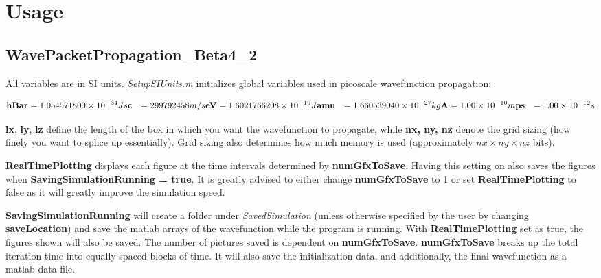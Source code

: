 \documentclass[11pt,letterpaper]{article}
\renewcommand{\\}{\bigskip}
\begin{document}
\section{Usage}

\subsection{WavePacketPropagation\_Beta4\_2} 

All variables are in SI units. \underline{\textit{SetupSIUnits.m}} initializes global variables used in picoscale wavefunction propagation:

\begin{align*}
    \textbf{hBar} &= 1.054571800 \times 10^{-34} Js\\
    \textbf{c} &= 299792458 m/s\\
    \textbf{eV} &= 1.6021766208 \times 10^{-19} J\\
    \textbf{amu} &=  1.660539040 \times 10^{-27} kg\\
    \textbf{A} &= 1.00 \times 10^{-10} m\\
    \textbf{ps} &= 1.00 \times 10^{-12} s
\end{align*}

\textbf{lx}, \textbf{ly}, \textbf{lz} define the length of the box in which you want the wavefunction to propagate, while \textbf{nx, ny, nz} denote the grid sizing (how finely you want to splice up essentially). Grid sizing also determines how much memory is used (approximately $nx \times ny \times nz$ bits).\\

\textbf{RealTimePlotting} displays each figure at the time intervals determined by \textbf{numGfxToSave}. Having this setting on also saves the figures when \textbf{SavingSimulationRunning = true}. It is greatly advised to either change \textbf{numGfxToSave} to 1 or set \textbf{RealTimePlotting} to false as it will greatly improve the simulation speed.\\

\textbf{SavingSimulationRunning} will create a folder under \underline{\textit{SavedSimulation}} (unless otherwise specified by the user by changing \textbf{saveLocation}) and save the matlab arrays of the wavefunction while the program is running. With \textbf{RealTimePlotting} set as true, the figures shown will also be saved. The number of pictures saved is dependent on \textbf{numGfxToSave}. \textbf{numGfxToSave} breaks up the total iteration time into equally spaced blocks of time. It will also save the initialization data, and additionally, the final wavefunction as a matlab data file.\\
\end{document}
